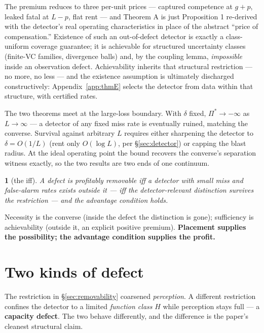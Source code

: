 \documentclass[11pt]{article}
\theoremstyle{plain}
\newtheorem*{namedthminner}{\namedthmname}
\newenvironment{nthm}[1]{\def\namedthmname{#1}\begin{namedthminner}}{\end{namedthminner}}
\theoremstyle{definition}
\begin{document}
The premium reduces to three per-unit prices --- captured competence at $g+p$,
leaked fatal at $L-p$, flat rent --- and Theorem A is just Proposition 1
re-derived with the detector's real operating characteristics in place of the
abstract ``price of compensation.'' Existence of such an out-of-defect detector
is exactly a class-uniform coverage guarantee; it is achievable for structured
uncertainty classes (finite-VC families, divergence balls) and, by the
coupling lemma, \emph{impossible} inside an observation defect. Achievability
inherits that structural restriction --- no more, no less --- and the existence
assumption is ultimately discharged constructively: Appendix~\ref{app:thmE} selects the
detector from data within that structure, with certified rates.

The two theorems meet at the large-loss boundary. With $\delta$ fixed,
$\Pi^* \to -\infty$ as $L \to \infty$ --- a detector of any fixed miss rate is
eventually ruined, matching the converse. Survival against arbitrary $L$
requires either sharpening the detector to $\delta = O(1/L)$ (rent only
$O(\log L)$, per \S\ref{sec:detector}) or capping the blast radius. At the ideal operating point
the bound recovers the converse's separation witness exactly, so the two
results are two ends of one continuum.

\begin{nthm}{Corollary}[the iff]
A defect is profitably removable iff a detector with
small miss and false-alarm rates exists outside it --- iff the detector-relevant
distinction survives the restriction --- and the advantage condition holds.
\end{nthm}

Necessity is the converse (inside the defect the distinction is gone);
sufficiency is achievability (outside it, an explicit positive premium).
\textbf{Placement supplies the possibility; the advantage condition supplies the
profit.}

\section{Two kinds of defect}\label{sec:taxonomy}

The restriction in \S\ref{sec:removability} coarsened \emph{perception}. A different restriction confines
the detector to a limited \emph{function class} $H$ while perception stays full --- a
\textbf{capacity defect}. The two behave differently, and the difference is the
paper's cleanest structural claim.
\end{document}
